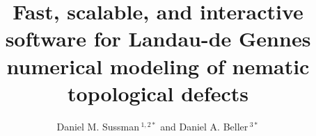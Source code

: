 \documentclass[utf8]{frontiersFPHY} %
\def\firstAuthorLast{Sussman and Beller} %
\def\Authors{Daniel M. Sussman\,$^{1,2*}$ and Daniel A. Beller\,$^{3*}$}
\begin{document}
\onecolumn
{}

\title[Fast, scalable, and interactive nematic modeling]{Fast, scalable, and interactive software for Landau-de Gennes numerical modeling of nematic topological defects} 

\author[\firstAuthorLast ]{\Authors} %
\address{} %
\correspondance{} %

\extraAuth{}%
\end{document}

